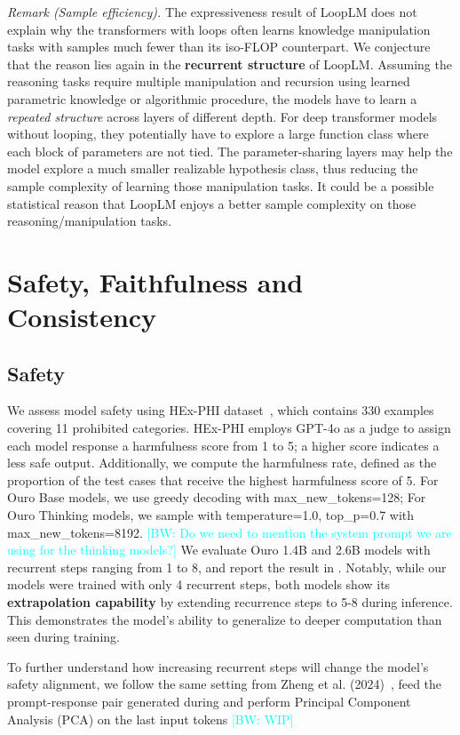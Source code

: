 \documentclass[]{bytedance_seed}
\newcommand{\1}{\mathbf{1}}
\newcommand{\ut}{LoopLM}
\newcommand{\boyi}[1]{\textcolor{cyan}{[BW: #1]}}
\begin{document}
\textit{Remark (Sample efficiency). } The expressiveness result of \ut{} does not explain why the transformers with loops often learns knowledge manipulation tasks with samples much fewer than its iso-FLOP counterpart. We conjecture that the reason lies again in the \textbf{recurrent structure} of \ut{}. Assuming the reasoning tasks require multiple manipulation and recursion using learned parametric knowledge or algorithmic procedure, the models have to learn a \textit{repeated structure} across layers of different depth. For deep transformer models without looping, they potentially have to explore a large function class where each block of parameters are not tied. The parameter-sharing layers may help the model explore a much smaller realizable hypothesis class, thus reducing the sample complexity of learning those manipulation tasks. It could be a possible statistical reason that \ut{} enjoys a better sample complexity on those reasoning/manipulation tasks.

\section{Safety, Faithfulness and Consistency}
\subsection{Safety}
\label{sec:safety}
We assess model safety using HEx-PHI dataset~\citep{qifine}, which contains 330 examples covering 11 prohibited categories. HEx-PHI employs GPT-4o as a judge to assign each model response a harmfulness score from 1 to 5; a higher score indicates a less safe output. Additionally, we compute the harmfulness rate, defined as the proportion of the test cases that receive the highest harmfulness score of 5.  For Ouro Base models, we use greedy decoding with max\_new\_tokens=128; For Ouro Thinking models, we sample with temperature=1.0, top\_p=0.7 with max\_new\_tokens=8192. \boyi{Do we need to mention the system prompt we are using for the thinking models?}
We evaluate Ouro 1.4B and 2.6B models with recurrent steps ranging from 1 to 8, and report the result in . Notably, while our models were trained with only 4 recurrent steps, both models show its \textbf{extrapolation capability} by extending recurrence steps to 5-8 during inference. This demonstrates the model's ability to generalize to deeper computation than seen during training. 


To further understand how increasing recurrent steps will change the model's safety alignment, we follow the same setting from Zheng et al. (2024)~\citep{zheng2024prompt}, feed the prompt-response pair generated during and perform Principal Component Analysis (PCA) on the last input tokens \boyi{WIP}
\end{document}
